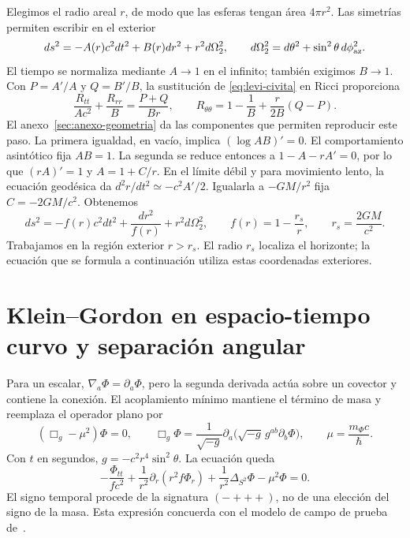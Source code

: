 Elegimos el radio areal $r$, de modo que las esferas tengan área $4\pi r^2$.
Las simetrías permiten escribir en el exterior
\[
ds^2=-A(r)c^2dt^2+B(r)dr^2+r^2d\Omega_2^2,\qquad
d\Omega_2^2=d\theta^2+\sin^2\theta\,d\phi_{\rm az}^2.
\]
El tiempo se normaliza mediante $A\to1$ en el infinito; también exigimos
$B\to1$. Con $P=A'/A$ y $Q=B'/B$, la sustitución de
\eqref{eq:levi-civita} en Ricci proporciona
\begin{equation}
\frac{R_{tt}}{Ac^2}+\frac{R_{rr}}{B}=\frac{P+Q}{Br},\qquad
R_{\theta\theta}=1-\frac1B+\frac{r}{2B}(Q-P).
\label{eq:ricci-estatico}
\end{equation}
El anexo~\ref{sec:anexo-geometria} da las componentes que permiten
reproducir este paso. La primera igualdad, en vacío, implica
$(\log AB)'=0$. El comportamiento asintótico fija $AB=1$.
La segunda se reduce entonces a $1-A-rA'=0$, por lo que
$(rA)'=1$ y $A=1+C/r$. En el límite débil y para movimiento lento,
la ecuación geodésica da $d^2r/dt^2\simeq-c^2A'/2$.
Igualarla a $-GM/r^2$ fija $C=-2GM/c^2$. Obtenemos
\begin{equation}
ds^2=-f(r)c^2dt^2+\frac{dr^2}{f(r)}+r^2d\Omega_2^2,\qquad
f(r)=1-\frac{r_s}{r},\qquad r_s=\frac{2GM}{c^2}.
\label{eq:metrica-schwarzschild}
\end{equation}
Trabajamos en la región exterior $r>r_s$. El radio $r_s$ localiza el
horizonte; la ecuación que se formula a continuación utiliza estas
coordenadas exteriores.



\section{Klein--Gordon en espacio-tiempo curvo y separación angular}

Para un escalar, $\nabla_a\Phi=\partial_a\Phi$, pero la segunda derivada
actúa sobre un covector y contiene la conexión. El acoplamiento mínimo
mantiene el término de masa y reemplaza el operador plano por
\begin{equation}
(\Box_g-\mu^2)\Phi=0,\qquad
\Box_g\Phi=\frac{1}{\sqrt{-g}}\partial_a
 \bigl(\sqrt{-g}\,g^{ab}\partial_b\Phi\bigr),\qquad
\mu=\frac{m_\Phi c}{\hbar}.
\label{eq:kg-curva}
\end{equation}
Con $t$ en segundos, $g=-c^2r^4\sin^2\theta$. La ecuación queda
\begin{equation}
-\frac{\Phi_{tt}}{fc^2}
+\frac1{r^2}\partial_r(r^2f\Phi_r)
+\frac1{r^2}\Delta_{S^2}\Phi-\mu^2\Phi=0.
\label{eq:kg-schwarzschild-sin-separar}
\end{equation}
El signo temporal procede de la signatura $(-+++)$, no de una elección
del signo de la masa. Esta expresión concuerda con el modelo de campo
de prueba de~\cite{Barranco2011}.

